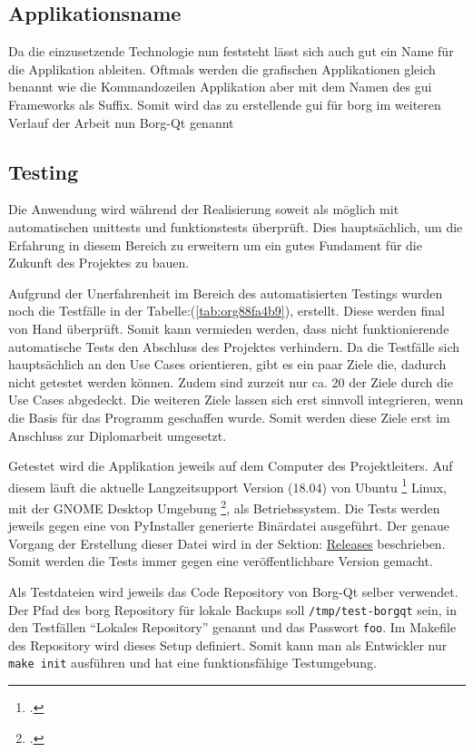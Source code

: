 \subsection{Applikationsname}
\label{sec:orgef6c2a4}

Da die einzusetzende Technologie nun feststeht lässt sich auch gut ein Name für
die Applikation ableiten. Oftmals werden die grafischen Applikationen gleich
benannt wie die Kommandozeilen Applikation aber mit dem Namen des \gls{gui}
Frameworks als Suffix. Somit wird das zu erstellende \gls{gui} für \gls{borg} im
weiteren Verlauf der Arbeit nun Borg-Qt genannt

\subsection{Testing}
\label{sec:orge549d43}

Die Anwendung wird während der Realisierung soweit als möglich mit
automatischen \glspl{unittest} und \glspl{funktionstest} überprüft. Dies
hauptsächlich, um die Erfahrung in diesem Bereich zu erweitern um ein gutes
Fundament für die Zukunft des Projektes zu bauen.

Aufgrund der Unerfahrenheit im Bereich des automatisierten Testings wurden noch
die Testfälle in der Tabelle:(\ref{tab:org88fa4b9}), erstellt. Diese werden final von
Hand überprüft. Somit kann vermieden werden, dass nicht funktionierende
automatische Tests den Abschluss des Projektes verhindern. Da die Testfälle
sich hauptsächlich an den Use Cases orientieren, gibt es ein paar Ziele die,
dadurch nicht getestet werden können. Zudem sind zurzeit nur ca. 20 der Ziele
durch die Use Cases abgedeckt. Die weiteren Ziele lassen sich erst sinnvoll
integrieren, wenn die Basis für das Programm geschaffen wurde. Somit werden
diese Ziele erst im Anschluss zur Diplomarbeit umgesetzt.

Getestet wird die Applikation jeweils auf dem Computer des Projektleiters. Auf
diesem läuft die aktuelle Langzeitsupport Version (18.04) von Ubuntu
\footcite{ubuntu} Linux, mit der GNOME Desktop Umgebung \footcite{gnome}, als
Betriebssystem. Die Tests werden jeweils gegen eine von PyInstaller generierte
Binärdatei ausgeführt. Der genaue Vorgang der Erstellung dieser Datei wird in
der Sektion: \hyperref[sec:org3adb3b3]{Releases} beschrieben. Somit werden die Tests immer gegen eine
veröffentlichbare Version gemacht.

Als Testdateien wird jeweils das Code Repository von Borg-Qt selber verwendet.
Der Pfad des \gls{borg} Repository für lokale Backups soll \texttt{/tmp/test-borgqt}
sein, in den Testfällen "`Lokales Repository"' genannt und das Passwort \texttt{foo}.
Im Makefile des Repository wird dieses Setup definiert. Somit kann man als
Entwickler nur \texttt{make init} ausführen und hat eine funktionsfähige Testumgebung.


